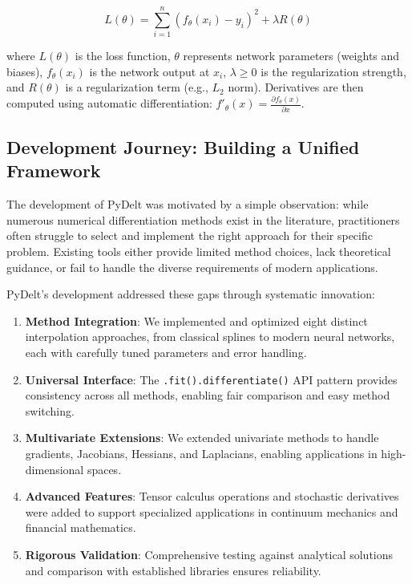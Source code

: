 \documentclass[10pt,journal,compsoc]{IEEEtran}
\begin{document}
\begin{itemize}
    \begin{equation}
        L(\theta) = \sum_{i=1}^{n} \left(f_{\theta}(x_i) - y_i\right)^2 + \lambda R(\theta)
    \end{equation}
    
    where $L(\theta)$ is the loss function, $\theta$ represents network parameters (weights and biases), $f_{\theta}(x_i)$ is the network output at $x_i$, $\lambda \geq 0$ is the regularization strength, and $R(\theta)$ is a regularization term (e.g., $L_2$ norm). Derivatives are then computed using automatic differentiation: $f'_{\theta}(x) = \frac{\partial f_{\theta}(x)}{\partial x}$.
\end{itemize}

\subsection{Development Journey: Building a Unified Framework}

The development of PyDelt was motivated by a simple observation: while numerous numerical differentiation methods exist in the literature, practitioners often struggle to select and implement the right approach for their specific problem. Existing tools either provide limited method choices, lack theoretical guidance, or fail to handle the diverse requirements of modern applications.

PyDelt's development addressed these gaps through systematic innovation:

\begin{enumerate}
    \item \textbf{Method Integration}: We implemented and optimized eight distinct interpolation approaches, from classical splines to modern neural networks, each with carefully tuned parameters and error handling.
    
    \item \textbf{Universal Interface}: The \texttt{.fit().differentiate()} API pattern provides consistency across all methods, enabling fair comparison and easy method switching.
    
    \item \textbf{Multivariate Extensions}: We extended univariate methods to handle gradients, Jacobians, Hessians, and Laplacians, enabling applications in high-dimensional spaces.
    
    \item \textbf{Advanced Features}: Tensor calculus operations and stochastic derivatives were added to support specialized applications in continuum mechanics and financial mathematics.
    
    \item \textbf{Rigorous Validation}: Comprehensive testing against analytical solutions and comparison with established libraries ensures reliability.
\end{enumerate}
\end{document}

